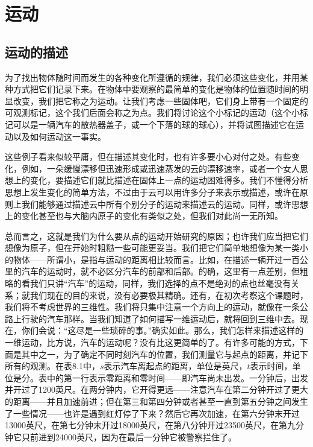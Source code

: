 \chapter{运动}

\section{运动的描述}

为了找出物体随时间而发生的各种变化所遵循的规律，我们必须这些变化，并用某种方式把它们记录下来。在物体中要观察的最简单的变化是物体的位置随时间的明显改变，我们把它称之为运动。让我们考虑一些固体吧，它们身上带有一个固定的可观测标记，这个我们后面会称之为点。我们将讨论这个小标记的运动（这个小标记可以是一辆汽车的散热器盖子，或一个下落的球的球心），并将试图描述它在运动以及如何运动这一事实。

这些例子看来似较平庸，但在描述其变化时，也有许多要小心对付之处。有些变化，例如，一朵缓慢漂移但迅速形成或迅速蒸发的云的漂移速率，或者一个女人思想上的变化，要描述它们就比描述在固体上一点的运动困难得多。我们不懂得分析思想上发生变化的简单方法，不过由于云可以用许多分子来表示或描述，或许在原则上我们能够通过描述云中所有个别分子的运动来描述云的运动。同样，或许思想上的变化甚至也与大脑内原子的变化有类似之处，但我们对此尚一无所知。

总而言之，这就是我们为什么要从点的运动开始研究的原因；也许我们应当把它们想像为原子，但在开始时粗糙一些可能更妥当。我们把它们简单地想像为某一类小的物体——所谓小，是指与运动的距离相比较而言。比如，在描述一辆开过一百公里的汽车的运动时，就不必区分汽车的前部和后部。的确，这里有一点差别，但粗略的看我们只讲“汽车”的运动，同样，我们选择的点不是绝对的点也丝毫没有关系；就我们现在的目的来说，没有必要极其精确。还有，在初次考察这个课题时，我们将不考虑世界的三维性。我们将只集中注意一个方向上的运动，就像在一条公路上行驶的汽车那样。当我们知道了如何描写一维运动后，就将回到三维中去。现在，你们会说：“这尽是一些琐碎的事。”确实如此。那么，我们怎样来描述这样的一维运动，比方说，汽车的运动呢？没有比这更简单的了。有许多可能的方式，下面是其中之一，为了确定不同时刻汽车的位置，我们测量它与起点的距离，并记下所有的观测。在表8.1中，$s$表示汽车离起点的距离，单位是英尺，$t$表示时间，单位是分。表中的第一行表示零距离和零时间——即汽车尚未出发。一分钟后，出发并开过了1200英尺。在两分钟内，它开得更远——注意汽车在第二分钟开过了更大的距离——并且加速前进；但在第三和第四分钟或者甚至一直到第五分钟之间发生了一些情况——也许是遇到红灯停了下来？然后它再次加速，在第六分钟末开过13000英尺，在第七分钟末开过18000英尺，在第八分钟开过23500英尺，在第九分钟它只前进到24000英尺，因为在最后一分钟它被警察拦住了。

